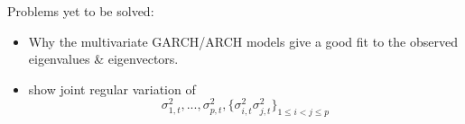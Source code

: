 \documentclass{beamer}
\begin{document}
\begin{frame}
  Problems yet to be solved:
  \begin{itemize}
  \item Why the multivariate GARCH/ARCH models give a good fit to the observed eigenvalues \& eigenvectors.
  \item show joint regular variation of
    \[
    \sigma_{1,t}^2, ..., \sigma_{p,t}^2, \{\sigma_{i,t}^2
    \sigma_{j,t}^2\}_{1 \leq i < j \leq p}
    \]
  \end{itemize}
\end{frame}

\end{document}
